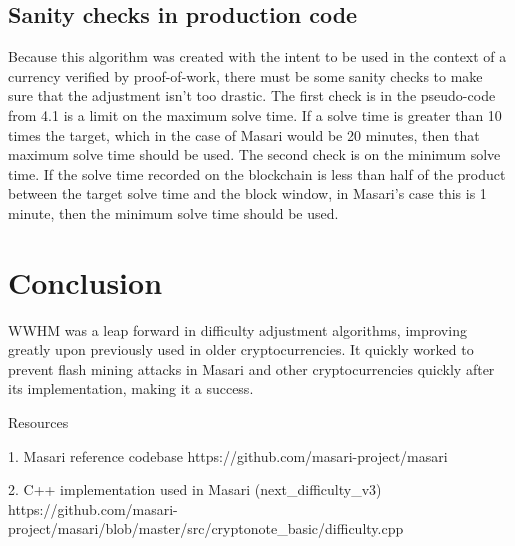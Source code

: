 \documentclass{article}
\begin{document}
\subsection{Sanity checks in production code}
Because this algorithm was created with the intent to be used in the context of a currency verified by proof-of-work, there must be some sanity checks to make sure that the adjustment isn't too drastic. The first check is in the pseudo-code from 4.1 is a limit on the maximum solve time. If a solve time is greater than 10 times the target, which in the case of Masari would be 20 minutes, then that maximum solve time should be used. The second check is on the minimum solve time. If the solve time recorded on the blockchain is less than half of the product between  the target solve time and the block window, in Masari's case this is 1 minute, then the minimum solve time should be used.

\section{Conclusion}
WWHM was a leap forward in difficulty adjustment algorithms, improving greatly upon previously used in older cryptocurrencies. It quickly worked to prevent flash mining attacks in Masari and other cryptocurrencies quickly after its implementation, making it a success.

\noindent 
\hfil\break
Resources
\newline

1. Masari reference codebase https://github.com/masari-project/masari

2. C++ implementation used in Masari (next\_difficulty\_v3) https://github.com/masari-project/masari/blob/master/src/cryptonote\_basic/difficulty.cpp
 
\end{document}
